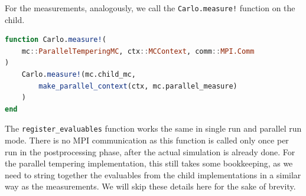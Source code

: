 \documentclass{SciPost}
\begin{document}
For the measurements, analogously, we call the \texttt{Carlo.measure!} function on the child.
\begin{lstlisting}[language=julia]
function Carlo.measure!(
    mc::ParallelTemperingMC, ctx::MCContext, comm::MPI.Comm
)
    Carlo.measure!(mc.child_mc,
        make_parallel_context(ctx, mc.parallel_measure)
    )
end
\end{lstlisting}
The \texttt{register\_{}evaluables} function works the same in single run and parallel run mode. There is no MPI communication as this function is called only once per run in the postprocessing phase, after the actual simulation is already done. For the parallel tempering implementation, this still takes some bookkeeping, as we need to string together the evaluables from the child implementations in a similar way as the measurements. We will skip these details here for the sake of brevity.
\end{document}

